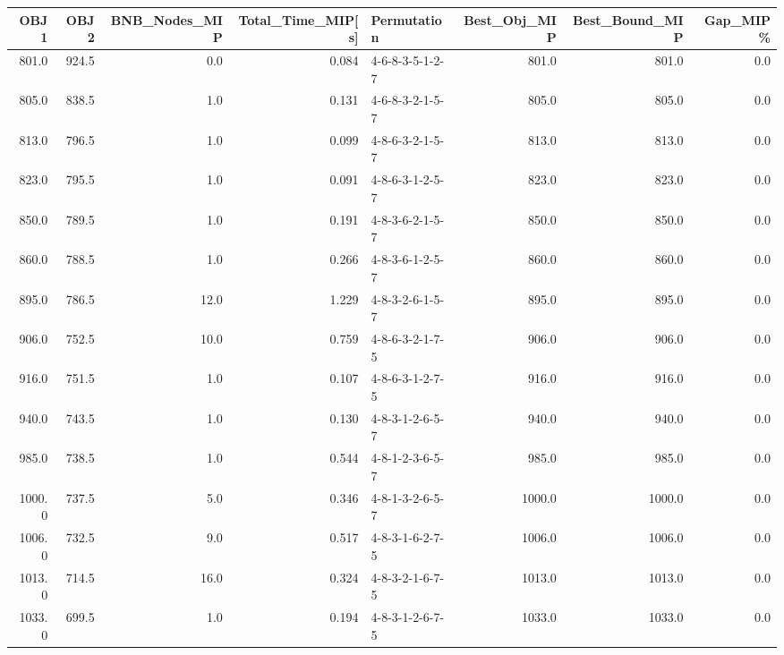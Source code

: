 \begin{tabular}{rrrrlrrr}
\toprule
   OBJ1 &   OBJ2 &  BNB\_Nodes\_MIP &  Total\_Time\_MIP[s] &      Permutation &  Best\_Obj\_MIP &  Best\_Bound\_MIP &  Gap\_MIP\% \\
\midrule
  801.0 &  924.5 &            0.0 &              0.084 &  4-6-8-3-5-1-2-7 &         801.0 &           801.0 &       0.0 \\
  805.0 &  838.5 &            1.0 &              0.131 &  4-6-8-3-2-1-5-7 &         805.0 &           805.0 &       0.0 \\
  813.0 &  796.5 &            1.0 &              0.099 &  4-8-6-3-2-1-5-7 &         813.0 &           813.0 &       0.0 \\
  823.0 &  795.5 &            1.0 &              0.091 &  4-8-6-3-1-2-5-7 &         823.0 &           823.0 &       0.0 \\
  850.0 &  789.5 &            1.0 &              0.191 &  4-8-3-6-2-1-5-7 &         850.0 &           850.0 &       0.0 \\
  860.0 &  788.5 &            1.0 &              0.266 &  4-8-3-6-1-2-5-7 &         860.0 &           860.0 &       0.0 \\
  895.0 &  786.5 &           12.0 &              1.229 &  4-8-3-2-6-1-5-7 &         895.0 &           895.0 &       0.0 \\
  906.0 &  752.5 &           10.0 &              0.759 &  4-8-6-3-2-1-7-5 &         906.0 &           906.0 &       0.0 \\
  916.0 &  751.5 &            1.0 &              0.107 &  4-8-6-3-1-2-7-5 &         916.0 &           916.0 &       0.0 \\
  940.0 &  743.5 &            1.0 &              0.130 &  4-8-3-1-2-6-5-7 &         940.0 &           940.0 &       0.0 \\
  985.0 &  738.5 &            1.0 &              0.544 &  4-8-1-2-3-6-5-7 &         985.0 &           985.0 &       0.0 \\
 1000.0 &  737.5 &            5.0 &              0.346 &  4-8-1-3-2-6-5-7 &        1000.0 &          1000.0 &       0.0 \\
 1006.0 &  732.5 &            9.0 &              0.517 &  4-8-3-1-6-2-7-5 &        1006.0 &          1006.0 &       0.0 \\
 1013.0 &  714.5 &           16.0 &              0.324 &  4-8-3-2-1-6-7-5 &        1013.0 &          1013.0 &       0.0 \\
 1033.0 &  699.5 &            1.0 &              0.194 &  4-8-3-1-2-6-7-5 &        1033.0 &          1033.0 &       0.0 \\

\end{tabular}
